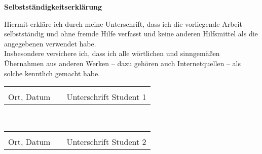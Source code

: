 \begin{centering}
\textbf{\Huge Selbstständigkeitserklärung}\\
\end{centering}
\vspace{1.5cm}
\begin{doublespacing}
Hiermit erkläre ich durch meine Unterschrift, dass ich die vorliegende Arbeit selbstständig und ohne fremde Hilfe verfasst und keine anderen Hilfsmittel als die angegebenen verwendet habe.\\

Insbesondere versichere ich, dass ich alle wörtlichen und sinngemäßen Übernahmen aus anderen Werken – dazu gehören auch Internetquellen – als solche kenntlich gemacht habe.\\
\end{doublespacing}
\vspace{2cm}

\begin{tabular}{lp{12em}l}
\hspace{5cm}  && \hspace{5cm} \\\cline{1-1}\cline{3-3}
Ort, Datum    && Unterschrift Student 1
\end{tabular}\\

\vspace{2cm}

\begin{tabular}{lp{12em}l}
\hspace{5cm}  && \hspace{5cm} \\\cline{1-1}\cline{3-3}
Ort, Datum    && Unterschrift Student 2
\end{tabular}\\

